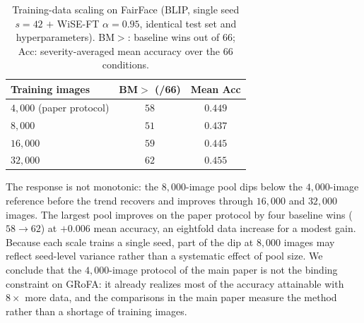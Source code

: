 \begin{table}[htbp]
\centering
\caption{Training-data scaling on FairFace (BLIP, single seed $s{=}42$ $+$ WiSE-FT $\alpha{=}0.95$, identical test set and hyperparameters). BM$>$: baseline wins out of 66; Acc: severity-averaged mean accuracy over the 66 conditions.}
\label{tab:scaling}
\small
\setlength{\tabcolsep}{6pt}
\begin{tabular}{lcc}
\toprule
Training images & BM$>$ (/66) & Mean Acc \\
\midrule
$4{,}000$ (paper protocol) & $58$ & $0.449$ \\
$8{,}000$  & $51$ & $0.437$ \\
$16{,}000$ & $59$ & $0.445$ \\
$32{,}000$ & $62$ & $0.455$ \\
\bottomrule
\end{tabular}
\end{table}

The response is not monotonic: the $8{,}000$-image pool dips below the $4{,}000$-image reference before the trend recovers and improves through $16{,}000$ and $32{,}000$ images.
The largest pool improves on the paper protocol by four baseline wins ($58{\to}62$) at $+0.006$ mean accuracy, an eightfold data increase for a modest gain.
Because each scale trains a single seed, part of the dip at $8{,}000$ images may reflect seed-level variance rather than a systematic effect of pool size.
We conclude that the $4{,}000$-image protocol of the main paper is not the binding constraint on GRoFA: it already realizes most of the accuracy attainable with $8\times$ more data, and the comparisons in the main paper measure the method rather than a shortage of training images.